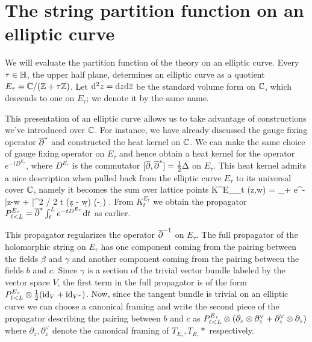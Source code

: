 \section{The string partition function on an elliptic curve}

We will evaluate the partition function of the theory on an elliptic curve. 
Every $\tau \in \mathbb H$, the upper half plane, 
determines an elliptic curve as a quotient $E_\tau = \mathbb C / (\mathbb Z + \tau \mathbb Z)$.
Let ${\rm d}^2 z = {\rm d} z {\rm d} \overline{z}$ be the standard volume form on $\mathbb C$, 
which descends to one on $E_\tau$; 
we denote it by the same name. 

This presentation of an elliptic curve allows us to take advantage of constructions we've introduced over $\mathbb C$.
For instance, we have already discussed the gauge fixing operator $\overline{\partial}^*$ and constructed the heat kernel on $\mathbb C$. 
We can make the same choice of gauge fixing operator on $E_\tau$ and hence obtain a heat kernel for the operator $e^{-t D^{E_\tau}}$, 
where $D^{E_\tau}$ is the commutator $[\overline{\partial}, \overline{\partial}^*] = \frac{1}{2} \Delta$ on $E_\tau$. 
This heat kernel admits a nice description when pulled back from the elliptic curve $E_\tau$ to its universal cover $\mathbb C$,
namely it becomes the sum over lattice points
\ben 
K^{E_\tau}_t (z,w) = \sum_{\lambda \in \ZZ + \tau \ZZ}  e^{-|z-w + \lambda|^2 / 2 t} (\d z - \d w) (\d \zbar - \d \wbar ) .
\een
From $K_t^{E_\tau}$ we obtain the propagator $P_{\ell < L}^{E_\tau} = \overline{\partial}^* \int_{\ell}^L e^{-t D^{E_\tau}} {\rm d} t$ as earlier. 

This propagator regularizes the operator $\overline{\partial}^{-1}$ on $E_\tau$. 
The full propagator of the holomorphic string on $E_\tau$ has one component coming from the pairing between the fields $\beta$ and $\gamma$ and another component coming from the pairing between the fields $b$ and $c$. 
Since $\gamma$ is a section of the trivial vector bundle labeled by the vector space $V$, the first term in the full propagator is of the form $P_{\ell < L}^{E_\tau} \otimes \frac{1}{2} ({\rm id}_V + {\rm id}_{V^*})$.
Now, since the tangent bundle is trivial on an elliptic curve we can choose a canonical framing and write the second piece of the propagator describing the pairing between $b$ and $c$ as $P_{\ell < L}^{E_\tau} \otimes (\partial_z \otimes \partial_z^\vee + \partial_z^\vee \otimes \partial_z)$ where $\partial_z, \partial_z^\vee$ denote the canonical framing of $T_{E_\tau}, T_{E_\tau}*$ respectively. 

